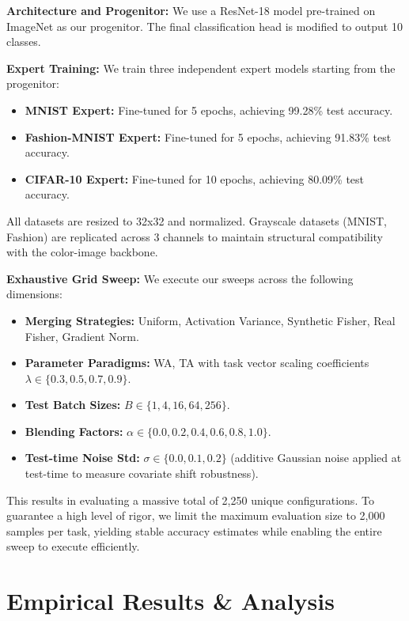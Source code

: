 \documentclass{article}
\theoremstyle{plain}
\theoremstyle{definition}
\theoremstyle{remark}
\begin{document}
\textbf{Architecture and Progenitor:} We use a ResNet-18 model \cite{he16resnet} pre-trained on ImageNet \cite{deng09imagenet} as our progenitor. The final classification head is modified to output 10 classes.

\textbf{Expert Training:}
We train three independent expert models starting from the progenitor:
\begin{itemize}
    \item \textbf{MNIST Expert:} Fine-tuned for 5 epochs, achieving 99.28\% test accuracy.
    \item \textbf{Fashion-MNIST Expert:} Fine-tuned for 5 epochs, achieving 91.83\% test accuracy.
    \item \textbf{CIFAR-10 Expert:} Fine-tuned for 10 epochs, achieving 80.09\% test accuracy.
\end{itemize}
All datasets are resized to 32x32 and normalized. Grayscale datasets (MNIST, Fashion) are replicated across 3 channels to maintain structural compatibility with the color-image backbone.

\textbf{Exhaustive Grid Sweep:}
We execute our sweeps across the following dimensions:
\begin{itemize}
    \item \textbf{Merging Strategies:} Uniform, Activation Variance, Synthetic Fisher, Real Fisher, Gradient Norm.
    \item \textbf{Parameter Paradigms:} WA, TA with task vector scaling coefficients $\lambda \in \{0.3, 0.5, 0.7, 0.9\}$.
    \item \textbf{Test Batch Sizes:} $B \in \{1, 4, 16, 64, 256\}$.
    \item \textbf{Blending Factors:} $\alpha \in \{0.0, 0.2, 0.4, 0.6, 0.8, 1.0\}$.
    \item \textbf{Test-time Noise Std:} $\sigma \in \{0.0, 0.1, 0.2\}$ (additive Gaussian noise applied at test-time to measure covariate shift robustness).
\end{itemize}
This results in evaluating a massive total of 2,250 unique configurations. To guarantee a high level of rigor, we limit the maximum evaluation size to 2,000 samples per task, yielding stable accuracy estimates while enabling the entire sweep to execute efficiently.

\section{Empirical Results \& Analysis}
\label{sec:results}
\end{document}
